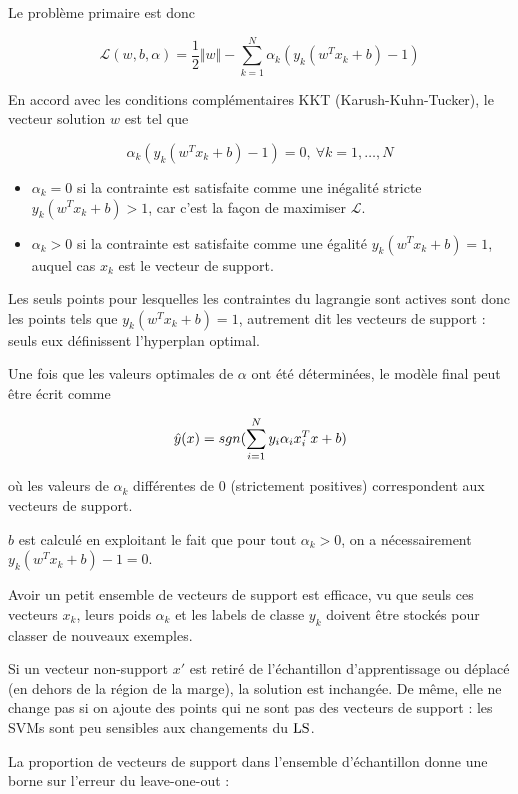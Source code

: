 	Le problème primaire est donc
	
	$$\mathcal{L}(w, b, \alpha) = \frac{1}{2} \Vert w \Vert - \sum_{k = 1}^N \alpha_k (y_k (w^Tx_k + b) - 1)$$
	
	En accord avec les conditions complémentaires KKT (Karush-Kuhn-Tucker), le vecteur solution $w$ est tel que
	
	$$\alpha_k (y_k (w^T x_k + b) - 1) = 0, \: \forall k = 1, \dots , N$$
	
	\begin{itemize}
		\item $\alpha_k = 0$ si la contrainte est satisfaite comme une inégalité stricte $y_k (w^T x_k + b) > 1$, car c'est la façon de maximiser $\mathcal{L}$.
		
		\item $\alpha_k > 0$ si la contrainte est satisfaite comme une égalité $y_k(w^Tx_k + b) = 1$, auquel cas $x_k$ est le vecteur de support.
	\end{itemize}
	
	Les seuls points pour lesquelles les contraintes du lagrangie sont actives sont donc les points tels que $y_k (w^T x_k + b) = 1$, autrement dit les vecteurs de support : seuls eux définissent l'hyperplan optimal.
	
	Une fois que les valeurs optimales de $\alpha$ ont été déterminées, le modèle final peut être écrit comme
	
	$$\hat{y}(x) = sgn(\sum_{i= 1}^N y_i \alpha_i x_i^T x + b)$$
	
	où les valeurs de $\alpha_k$ différentes de 0 (strictement positives) correspondent aux vecteurs de support.
	
	$b$ est calculé en exploitant le fait que pour tout $\alpha_k > 0$, on a nécessairement $y_k(w^Tx_k + b) - 1 = 0$.
	
	
	Avoir un petit ensemble de vecteurs de support est efficace, vu que seuls ces vecteurs $x_k$, leurs poids $\alpha_k$ et les labels de classe $y_k$ doivent être stockés pour classer de nouveaux exemples.
	
	Si un vecteur non-support $x'$ est retiré de l'échantillon d'apprentissage ou déplacé (en dehors de la région de la marge), la solution est inchangée. De même, elle ne change pas si on ajoute des points qui ne sont pas des vecteurs de support : les SVMs sont peu sensibles aux changements du $\text{LS}$.
	
	La proportion de vecteurs de support dans l'ensemble d'échantillon donne une borne sur l'erreur du leave-one-out :
	
